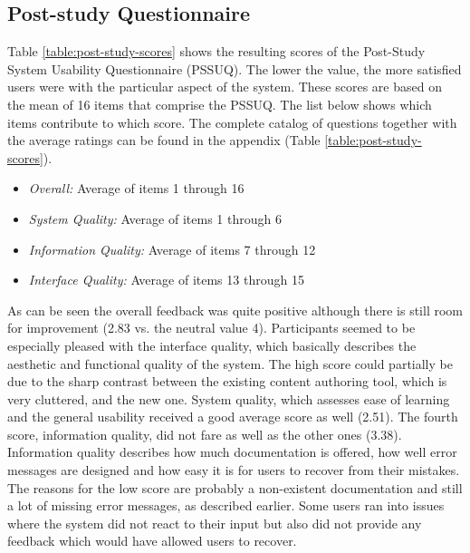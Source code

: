 

\subsection{Post-study Questionnaire}
Table \ref{table:post-study-scores} shows the resulting  scores of the Post-Study System Usability Questionnaire (PSSUQ). The lower the value, the more satisfied users were with the particular aspect of the system. These scores are based on the mean of 16 items that comprise the PSSUQ. The list below shows which items contribute to which score. The complete catalog of questions together with the average ratings can be found in the appendix (Table \ref{table:post-study-scores}).

\begin{itemize}
 \item \textit{Overall:} Average of items 1 through 16
 \item \textit{System Quality:} Average of items 1 through 6
 \item \textit{Information Quality:} Average of items 7 through 12
 \item \textit{Interface Quality:} Average of items 13 through 15
\end{itemize}

As can be seen the overall feedback was quite positive although there is still room for improvement (2.83 vs. the neutral value 4). Participants seemed to be especially pleased with the interface quality, which basically describes the aesthetic and functional quality of the system. The high score could partially be due to the sharp contrast between the existing content authoring tool, which is very cluttered, and the new one. System quality, which assesses ease of learning and the general usability received a good average score as well (2.51). The fourth score, information quality, did not fare as well as the other ones (3.38). Information quality describes how much documentation is offered, how well error messages are designed and how easy it is for users to recover from their mistakes. The reasons for the low score are probably a non-existent documentation and still a lot of missing error messages, as described earlier. Some users ran into issues where the system did not react to their input but also did not provide any feedback which would have allowed users to recover.

